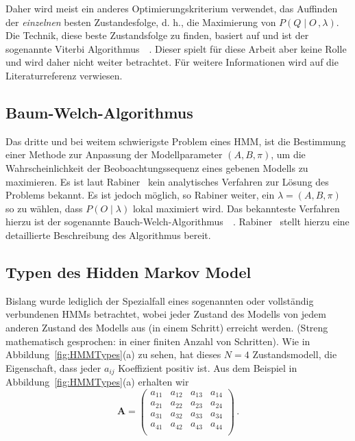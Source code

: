 \newline
Daher wird meist ein anderes Optimierungskriterium verwendet, das Auffinden der \textit{einzelnen} besten Zustandesfolge, d. h., die Maximierung von $P (Q \mid O \, , \lambda)$. Die Technik, diese beste Zustandsfolge zu finden, basiert auf  und ist der sogenannte Viterbi Algorithmus~\cite{bib:viterbi}~\cite{bib:forney}.
\newline
Dieser spielt f\"ur diese Arbeit aber keine Rolle und wird daher nicht weiter betrachtet. F\"ur weitere Informationen wird auf die Literaturreferenz verwiesen.

\subsection{Baum-Welch-Algorithmus}
Das dritte und bei weitem schwierigste Problem eines \gls{HMM}, ist die Bestimmung einer Methode zur Anpassung der Modellparameter $(A, B, \pi)$, um die Wahrscheinlichkeit der Beoboachtungssequenz eines gebenen Modells zu maximieren.
\newline
Es ist laut Rabiner~\cite[S.~264]{bib:hmmrabiner} kein analytisches Verfahren zur L\"osung des Problems bekannt. Es ist jedoch m\"oglich, so Rabiner weiter, ein $\lambda = (A, B, \pi)$ so zu w\"ahlen, dass $P (O \mid \lambda)$ lokal maximiert wird. Das bekannteste Verfahren hierzu ist der sogenannte Bauch-Welch-Algorithmus~\cite{bib:baumFellow}~\cite{bib:baumWelch}.
\newline
Rabiner~\cite[S.~264ff]{bib:hmmRabiner} stellt hierzu eine detaillierte Beschreibung des Algorithmus bereit.

\subsection{Typen des Hidden Markov Model}
Bislang wurde lediglich der Spezialfall eines sogenannten  oder vollst\"andig verbundenen \acrshort{HMM}s betrachtet, wobei jeder Zustand des Modells von jedem anderen Zustand des Modells aus (in einem Schritt) erreicht werden. (Streng mathematisch gesprochen: in einer finiten Anzahl von Schritten). Wie in Abbildung~\ref{fig:HMMTypes}(a) zu sehen, hat dieses $N = 4$ Zustandsmodell, die Eigenschaft, dass jeder $a_{ij}$ Koeffizient positiv ist. Aus dem Beispiel in Abbildung~\ref{fig:HMMTypes}(a) erhalten wir
\begin{equation}
\mathbf{A} = 
\begin{pmatrix}
a_{11} & a_{12} & a_{13} & a_{14} \\
a_{21} & a_{22} & a_{23} & a_{24} \\
a_{31} & a_{32} & a_{33} & a_{34} \\
a_{41} & a_{42} & a_{43} & a_{44} \\
\end{pmatrix} \, .
\end{equation}

